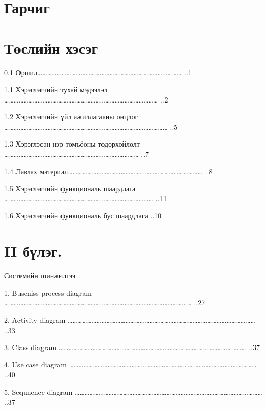 \documentclass[12pt]{article}
\begin{document}
	
	
	
\section     {Гарчиг}

\section     {Төслийн хэсэг}
               0.1  Оршил………………………………………………………………………………                ..1                           
               
               1.1  Хэрэглэгчийн тухай мэдээлэл ……………………………………………………………………………………                   
               ..2
               
               1.2  Хэрэглэгчийн үйл ажиллагааны онцлог …………………………………………………………………………………………         
               ..5
               
               1.3  Хэрэглэсэн нэр томъёоны тодорхойлолт …………………………………………………………………………                       ..7
               
               1.4  Лавлах материал…………………………………………………………………………          ..8
               
               1.5  Хэрэглэгчийн функциональ шаардлага …………………………………………………………………………………                    ..11
               
               1.6  Хэрэглэгчийн функциональ бус шаардлага                                          ..10
               
               
\section     {II бүлэг.}  Системийн шинжилгээ

               1.   Buseniss process diagram ………………………………………………………………………………………………………               
                ..27
               
               2.	Activity diagram ………………………………………………………………………………………………………                   
                ..33
               
               3.	Class diagram ………………………………………………………………………………………………………                   
                ..37
                
               4.   Use case diagram
               ………………………………………………………………………………………………………                 
                ..40
                
               5.   Sequnence diagram
               ………………………………………………………………………………………………………                   
                ..37
                
\end{document}
